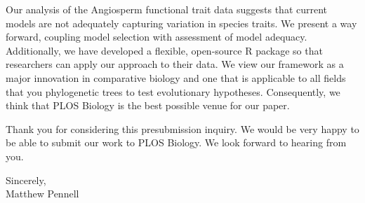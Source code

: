 \documentclass[a4paper,12pt]{article}
\begin{document}
Our analysis of the Angiosperm functional trait data suggests that current models are not adequately capturing variation in species traits. We present a way forward, coupling model selection with assessment of model adequacy. Additionally, we have developed a flexible, open-source R package so that researchers can apply our approach to their data. We view our framework as a major innovation in comparative biology and one that is applicable to all fields that you phylogenetic trees to test evolutionary hypotheses. Consequently, we think that PLOS Biology is the best possible venue for our paper. 

Thank you for considering this presubmission inquiry. We would be very happy to be able to submit our work to PLOS Biology. We look forward to hearing from you.

\begin{flushright}
\vspace{2ex}
\hspace{.2\textwidth}Sincerely,\\
\hspace*{.3\textwidth}
Matthew Pennell
\end{flushright}



\end{document}
